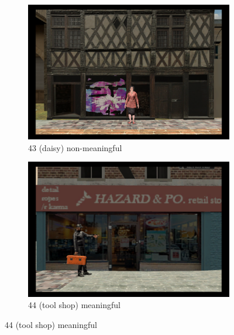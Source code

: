 \begin{figure}[!htb]
	\centering
	\begin{subfigure}[b]{0.48\linewidth}
		\includegraphics[width=\linewidth]{figures/starting_locations_appx/43_R(daisy)_A.PNG}
		\caption{43 (daisy) non-meaningful}
		\label{fig:43_R(daisy)_A}
	\end{subfigure}
	\begin{subfigure}[b]{0.48\linewidth}
		\includegraphics[width=\linewidth]{figures/starting_locations_appx/44_S(tool shop)_A.PNG}
		\caption{44 (tool shop) meaningful}
		\label{fig:44_S(tool shop)_A}
	\end{subfigure}
	

\end{figure}
